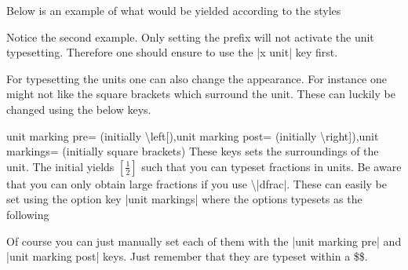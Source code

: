 Below is an example of what would be yielded according to the styles
\begin{codeexample}
  \pgfplotsset{use units,x unit=T,xlabel=Temperature,ylabel=Nothing} 
  \pgfplotsset{use units,x unit prefix=m,xlabel=Temperature,ylabel=Nothing} 
\end{codeexample}
Notice the second example. Only setting the prefix will not activate the unit typesetting. Therefore one should ensure to use the |x unit| key first.

For typesetting the units one can also change the appearance. For instance one might not like the square brackets which surround the unit. These can
luckily be changed using the below keys.
\begin{pgfplotskeylist}{unit marking pre= (initially \textbackslash left[),unit marking post= (initially \textbackslash right]),unit markings= (initially square brackets)}
  These keys sets the surroundings of the unit. The initial yields $\left[\frac{1}{2}\right]$ such that you can typeset fractions in units. Be aware that
  you can only obtain large fractions if you use \textbackslash|dfrac|. These can easily be set using the option key |unit markings| where the options typesets as the following
\begin{codeexample}
  \pgfplotsset{x unit=T,unit markings=parenthesis} %
  \pgfplotsset{x unit=T,unit markings=square brackets} %
  \pgfplotsset{x unit=T,unit markings=slash space} %
\end{codeexample}
  Of course you can just manually set each of them with the |unit marking pre| and |unit marking post| keys. Just remember that they are typeset within a \$\$.
\end{pgfplotskeylist}

